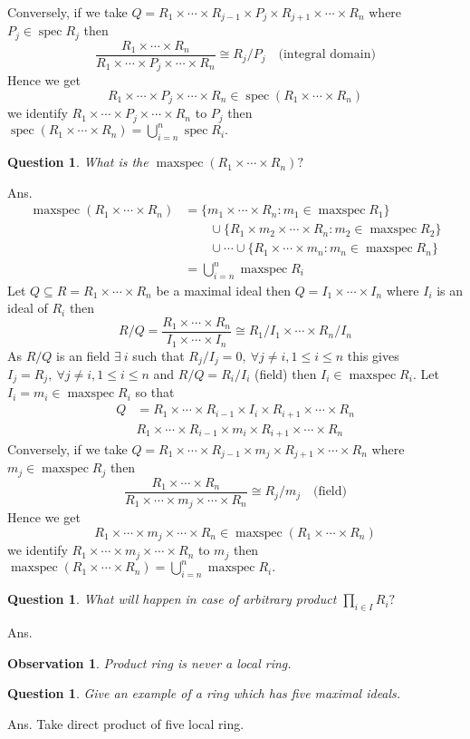 \documentclass[11pt]{amsart}
\newtheorem{qns}[theorem]{Question}
\newtheorem{obs}[theorem]{Observation}
\begin{document}
Conversely, if we take $Q=R_1\times \cdots \times R_{j-1}\times P_j\times R_{j+1}\times \cdots \times R_n$ where $P_j\in \operatorname{spec}R_j$ then $$\dfrac{R_1\times \cdots \times R_n}{R_1\times \cdots \times P_j\times \cdots \times R_n}\cong R_j/P_j \quad \text{(integral domain)}$$ Hence we get $$R_1\times \cdots \times P_j\times \cdots \times R_n\in \operatorname{spec}(R_1\times \cdots \times R_n)$$ we identify $R_1\times \cdots \times P_j\times \cdots \times R_n$ to $P_j$ then $\operatorname{spec}(R_1\times \cdots \times R_n)=\displaystyle\bigcup_{i=n}^n \operatorname{spec} R_i.$
\begin{qns}
What is the $\operatorname{maxspec}(R_1\times \cdots \times R_n)?$
\end{qns}
Ans. \begin{align*}
\operatorname{maxspec}(R_1\times \cdots \times R_n)&=\{m_1\times \cdots \times R_n:m_1\in \operatorname{maxspec}R_1\}\\
&\quad\quad \cup \{R_1\times m_2\times \cdots \times R_n:m_2\in \operatorname{maxspec}R_2\}\\
&\quad\quad \cup \cdots \cup \{R_1\times \cdots \times m_n:m_n\in \operatorname{maxspec}R_n\}\\
&=\displaystyle\bigcup_{i=n}^n \operatorname{maxspec} R_i
\end{align*}
Let $Q\subseteq R=R_1\times \cdots \times R_n$ be a maximal ideal then $Q=I_1\times \cdots \times I_n$ where $I_i$ is an ideal of $R_i$ then $$R/Q=\dfrac{R_1\times \cdots \times R_n}{I_1\times \cdots \times I_n}\cong R_1/I_1\times \cdots \times R_n/I_n$$ 
As $R/Q$ is an field $\exists ~i$ such that $R_j/I_j=0,~\forall j\neq i,1\leq i\leq n$ this gives $I_j=R_j,~\forall j\neq i,1\leq i\leq n$ and $R/Q=R_i/I_i$ (field) then $I_i\in \operatorname{maxspec} R_i.$ Let $I_i=m_i\in \operatorname{maxspec} R_i$ so that \begin{align*}
Q&=R_1\times \cdots \times R_{i-1}\times I_i\times R_{i+1}\times \cdots \times R_n\\
&R_1\times \cdots \times R_{i-1}\times m_i\times R_{i+1}\times \cdots \times R_n
\end{align*}
Conversely, if we take $Q=R_1\times \cdots \times R_{j-1}\times m_j\times R_{j+1}\times \cdots \times R_n$ where $m_j\in \operatorname{maxspec}R_j$ then $$\dfrac{R_1\times \cdots \times R_n}{R_1\times \cdots \times m_j\times \cdots \times R_n}\cong R_j/m_j \quad \text{(field)}$$ Hence we get $$R_1\times \cdots \times m_j\times \cdots \times R_n\in \operatorname{maxspec}(R_1\times \cdots \times R_n)$$ we identify $R_1\times \cdots \times m_j\times \cdots \times R_n$ to $m_j$ then $\operatorname{maxspec}(R_1\times \cdots \times R_n)=\displaystyle\bigcup_{i=n}^n \operatorname{maxspec} R_i.$
\begin{qns}
What will happen in case of arbitrary product $\displaystyle\prod_{i\in I} R_i?$
\end{qns}
Ans. 
\begin{obs}
Product ring is never a local ring.
\end{obs}
\begin{qns}
Give an example of a ring which has five maximal ideals.
\end{qns}
Ans. Take direct product of five local ring.
\end{document}
